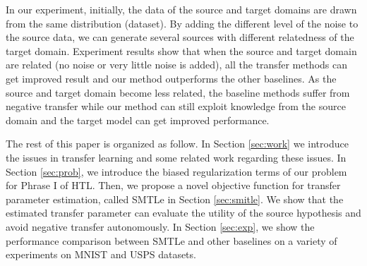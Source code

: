 In our experiment, initially, the data of the source and target domains are drawn from the same distribution (dataset). By adding the different level of the noise to the source data, we can generate several sources with different relatedness of the target domain. Experiment results show that when the source and target domain are related (no noise or very little noise is added), all the transfer methods can get improved result and our method outperforms the other baselines. As the source and target domain become less related, the baseline methods suffer from negative transfer while our method can still exploit knowledge from the source domain and the target model can get improved performance. 

The rest of this paper is organized as follow. In Section \ref{sec:work} we introduce the issues in transfer learning and some related work regarding these issues.
In Section \ref{sec:prob}, we introduce the biased regularization terms of our problem for Phrase I of HTL. Then, we propose a novel objective function for transfer parameter estimation, called SMTLe in Section \ref{sec:smitle}. We show that the estimated transfer parameter can evaluate the utility of the source hypothesis and avoid negative transfer autonomously. In Section \ref{sec:exp}, we show the performance comparison between SMTLe and other baselines on a variety of experiments on MNIST and USPS datasets.
